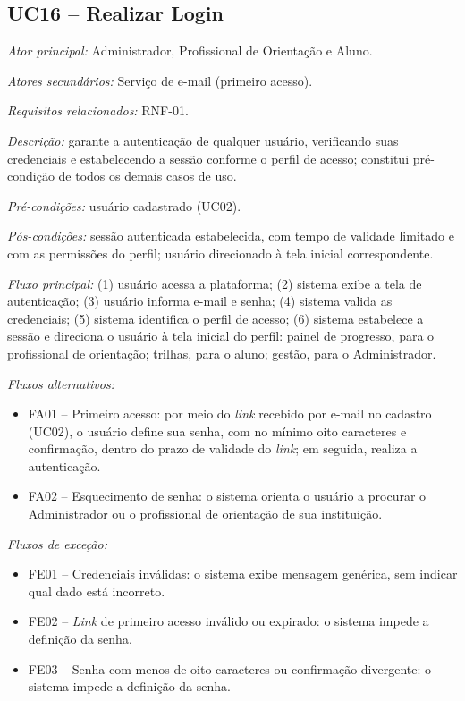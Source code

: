 \subsection*{UC16 -- Realizar Login}\label{uc:uc16}

\textit{Ator principal:} Administrador, Profissional de Orientação e Aluno.

\textit{Atores secundários:} Serviço de e-mail (primeiro acesso).

\textit{Requisitos relacionados:} RNF-01.

\textit{Descrição:} garante a autenticação de qualquer usuário, verificando suas credenciais e estabelecendo a sessão conforme o perfil de acesso; constitui pré-condição de todos os demais casos de uso.

\textit{Pré-condições:} usuário cadastrado (UC02).

\textit{Pós-condições:} sessão autenticada estabelecida, com tempo de validade limitado e com as permissões do perfil; usuário direcionado à tela inicial correspondente.

\textit{Fluxo principal:} (1) usuário acessa a plataforma; (2) sistema exibe a tela de autenticação; (3) usuário informa e-mail e senha; (4) sistema valida as credenciais; (5) sistema identifica o perfil de acesso; (6) sistema estabelece a sessão e direciona o usuário à tela inicial do perfil: painel de progresso, para o profissional de orientação; trilhas, para o aluno; gestão, para o Administrador.

\textit{Fluxos alternativos:}

\begin{itemize}[label={},leftmargin=\parindent,itemsep=0pt,topsep=0pt]
  \item FA01 – Primeiro acesso: por meio do \textit{link} recebido por e-mail no cadastro (UC02), o usuário define sua senha, com no mínimo oito caracteres e confirmação, dentro do prazo de validade do \textit{link}; em seguida, realiza a autenticação.
  \item FA02 – Esquecimento de senha: o sistema orienta o usuário a procurar o Administrador ou o profissional de orientação de sua instituição.
\end{itemize}

\textit{Fluxos de exceção:}

\begin{itemize}[label={},leftmargin=\parindent,itemsep=0pt,topsep=0pt]
  \item FE01 – Credenciais inválidas: o sistema exibe mensagem genérica, sem indicar qual dado está incorreto.
  \item FE02 – \textit{Link} de primeiro acesso inválido ou expirado: o sistema impede a definição da senha.
  \item FE03 – Senha com menos de oito caracteres ou confirmação divergente: o sistema impede a definição da senha.
\end{itemize}

